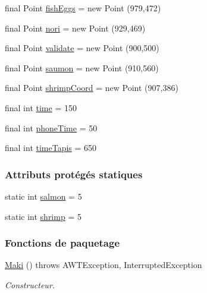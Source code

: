 \begin{DoxyCompactItemize}
\item 
final Point \hyperlink{classTestSushi_1_1src_1_1Suchi_1_1Recette_a2f5cec48c186dc52c3d990df66f3a8cf}{fish\+Eggs} = new Point (979,472)
\item 
final Point \hyperlink{classTestSushi_1_1src_1_1Suchi_1_1Recette_a4f3e62b4ab32fcc5d8b6875996f47618}{nori} = new Point (929,469)
\item 
final Point \hyperlink{classTestSushi_1_1src_1_1Suchi_1_1Recette_a9c491e7f09a444817e433e54923e6bca}{validate} = new Point (900,500)
\item 
final Point \hyperlink{classTestSushi_1_1src_1_1Suchi_1_1Recette_a855a7ed217eec3565619156fa6cd4214}{saumon} = new Point (910,560)
\item 
final Point \hyperlink{classTestSushi_1_1src_1_1Suchi_1_1Recette_a69faeadec2c0d475bbd77c3b7eeaada7}{shrimp\+Coord} = new Point (907,386)
\item 
final int \hyperlink{classTestSushi_1_1src_1_1Suchi_1_1Recette_a2c78759553661a7e4b01d4ac1212ec6c}{time} = 150
\item 
final int \hyperlink{classTestSushi_1_1src_1_1Suchi_1_1Recette_a0d95a4a68ee0d423b6815b296f3304b2}{phone\+Time} = 50
\item 
final int \hyperlink{classTestSushi_1_1src_1_1Suchi_1_1Recette_a7db8ec6383e36487bc7ca0490edd0b4a}{time\+Tapis} = 650
\end{DoxyCompactItemize}
\subsubsection*{Attributs protégés statiques}
\begin{DoxyCompactItemize}
\item 
static int \hyperlink{classTestSushi_1_1src_1_1Suchi_1_1Recette_a726a712fe936ef2a96982e00d21c49c0}{salmon} = 5
\item 
static int \hyperlink{classTestSushi_1_1src_1_1Suchi_1_1Recette_a07fa939a0df1b7ff45a9d4aa77498e8e}{shrimp} = 5
\end{DoxyCompactItemize}
\subsubsection*{Fonctions de paquetage}
\begin{DoxyCompactItemize}
\item 
\hyperlink{classTestSushi_1_1src_1_1Suchi_1_1Maki_a94d7a622bf2645cf7a6ac22b723a1fc7}{Maki} ()  throws A\+W\+T\+Exception, Interrupted\+Exception 
\begin{DoxyCompactList}\small\item\em Constructeur. \end{DoxyCompactList}\end{DoxyCompactItemize}
